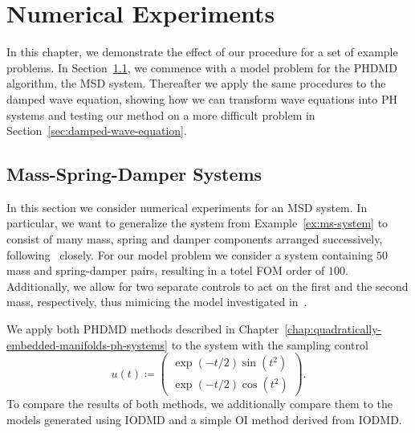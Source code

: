\chapter{Numerical Experiments}\label{chap:numerical-experiments}

In this chapter, we demonstrate the effect of our procedure for a set of example problems.
In Section~\ref{sec:msd-systems}, we commence with a model problem for the \ac{PHDMD} algorithm, the \ac{MSD} system.
Thereafter we apply the same procedures to the damped wave equation, showing how we can transform wave equations into \ac{PH} systems and testing our method on a more difficult problem in Section~\ref{sec:damped-wave-equation}.



\section{Mass-Spring-Damper Systems}\label{sec:msd-systems}

In this section we consider numerical experiments for an \ac{MSD} system.
In particular, we want to generalize the system from Example~\ref{ex:ms-system} to consist of many mass, spring and damper components arranged successively, following~\cite{Gugercin2012, Morandin2023} closely.
For our model problem we consider a system containing $50$ mass and spring-damper pairs, resulting in a totel \ac{FOM} order of $100$.
Additionally, we allow for two separate controls to act on the first and the second mass, respectively, thus mimicing the model investigated in~\cite[Section~4.3]{Morandin2023}.

We apply both \ac{PHDMD} methods described in Chapter~\ref{chap:quadratically-embedded-manifolds-ph-systems} to the system with the sampling control
\begin{equation*}
    u(t) \coloneqq \begin{pmatrix}
        \exp (-t / 2) \sin (t^2) \\
        \exp (-t / 2) \cos (t^2)
    \end{pmatrix}.
\end{equation*}
To compare the results of both methods, we additionally compare them to the models generated using \ac{IODMD} and a simple \ac{OI} method derived from \ac{IODMD}.


